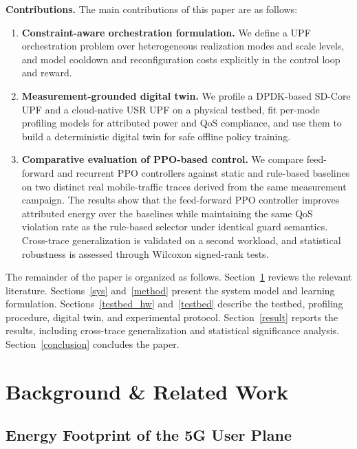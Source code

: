 \documentclass[a4paper,fleqn]{cas-sc}
\begin{document}
\textbf{Contributions.} The main contributions of this paper are as follows:
\begin{enumerate}
    \item \textbf{Constraint-aware orchestration formulation.} We define a UPF orchestration problem over heterogeneous realization modes and scale levels, and model cooldown and reconfiguration costs explicitly in the control loop and reward.
    \item \textbf{Measurement-grounded digital twin.} We profile a DPDK-based SD-Core UPF and a cloud-native USR UPF on a physical testbed, fit per-mode profiling models for attributed power and QoS compliance, and use them to build a deterministic digital twin for safe offline policy training.
    \item \textbf{Comparative evaluation of PPO-based control.} We compare feed-forward and recurrent PPO controllers against static and rule-based baselines on two distinct real mobile-traffic traces derived from the same measurement campaign. The results show that the feed-forward PPO controller improves attributed energy over the baselines while maintaining the same QoS violation rate as the rule-based selector under identical guard semantics. Cross-trace generalization is validated on a second workload, and statistical robustness is assessed through Wilcoxon signed-rank tests.
\end{enumerate}

The remainder of the paper is organized as follows. Section~\ref{related} reviews the relevant literature. Sections~\ref{sys} and~\ref{method} present the system model and learning formulation. Sections~\ref{testbed_hw} and~\ref{testbed} describe the testbed, profiling procedure, digital twin, and experimental protocol. Section~\ref{result} reports the results, including cross-trace generalization and statistical significance analysis. Section~\ref{conclusion} concludes the paper.

\section{Background \& Related Work}
\label{related}

\subsection{Energy Footprint of the 5G User Plane}
\label{subsec:rel_energy}
\end{document}
